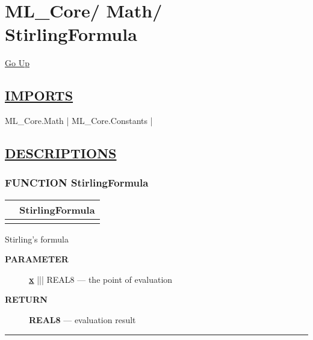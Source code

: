 \chapter*{\color{headfile}
{\large ML\_Core\slash\hspace{0pt}}
{\large Math\slash\hspace{0pt}}
 \\
StirlingFormula
}
\hypertarget{ecldoc:toc:ML_Core.Math.StirlingFormula}{}
\hyperlink{ecldoc:toc:root/ML_Core/Math}{Go Up}

\section*{\underline{\textsf{IMPORTS}}}
\begin{doublespace}
{\large
ML\_Core.Math |
ML\_Core.Constants |
}
\end{doublespace}

\section*{\underline{\textsf{DESCRIPTIONS}}}
\subsection*{\textsf{\colorbox{headtoc}{\color{white} FUNCTION}
StirlingFormula}}

\hypertarget{ecldoc:ml_core.math.stirlingformula}{}

{\renewcommand{\arraystretch}{1.5}
\begin{tabularx}{\textwidth}{|>{\raggedright\arraybackslash}l|X|}
\hline
\hspace{0pt}\mytexttt{\color{red} } & \textbf{StirlingFormula} \\
\hline
\multicolumn{2}{|>{\raggedright\arraybackslash}X|}{\hspace{0pt}\mytexttt{\color{param} (REAL x)}} \\
\hline
\end{tabularx}
}

\par





Stirling's formula






\par
\begin{description}
\item [\colorbox{tagtype}{\color{white} \textbf{\textsf{PARAMETER}}}] \textbf{\underline{x}} ||| REAL8 --- the point of evaluation
\end{description}







\par
\begin{description}
\item [\colorbox{tagtype}{\color{white} \textbf{\textsf{RETURN}}}] \textbf{REAL8} --- evaluation result
\end{description}




\rule{\linewidth}{0.5pt}
